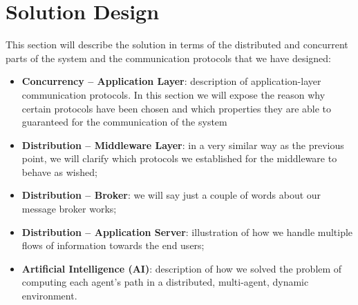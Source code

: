 \section{Solution Design}

This section will describe the solution in terms of the distributed and
concurrent parts of the system and the communication protocols that we have
designed:

\begin{itemize}
\item \textbf{Concurrency -- Application Layer}:
  description of application-layer communication protocols. In this section we
  will expose the reason why certain protocols have been chosen and which
  properties they are able to guaranteed for the communication of the system
\item \textbf{Distribution -- Middleware Layer}:
  in a very similar way as the previous point, we will clarify which protocols
  we established for the middleware to behave as wished;
\item \textbf{Distribution -- Broker}:
  we will say just a couple of words about our message broker works;
\item \textbf{Distribution -- Application Server}:
  illustration of how we handle multiple flows of information towards the end
  users;
\item \textbf{Artificial Intelligence (AI)}:
  description of how we solved the problem of computing each agent's path
  in a distributed, multi-agent, dynamic environment.
\end{itemize}










